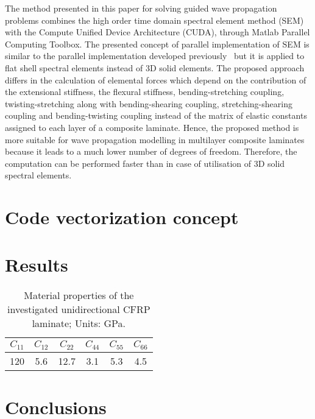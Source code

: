 \documentclass[runningheads]{llncs}
\begin{document}
The method presented in this paper for solving guided wave propagation problems combines the high order time domain spectral element method (SEM) with the Compute Unified Device Architecture (CUDA),  through Matlab Parallel Computing Toolbox. 
The presented concept of parallel implementation of SEM is similar to the parallel implementation developed previously~\cite{Kudela2016} but it is applied to flat shell spectral elements instead of 3D solid elements. 
The proposed approach differs in the calculation of elemental forces which depend on the contribution of the extensional stiffness, the flexural stiffness, bending-stretching coupling,  twisting-stretching along with bending-shearing coupling, stretching-shearing coupling and bending-twisting coupling instead of the matrix of elastic constants assigned to each layer of a composite laminate. 
Hence, the proposed method is more suitable for wave propagation modelling in multilayer composite laminates because it leads to a much lower number of degrees of freedom. 
Therefore, the computation can be performed faster than in case of utilisation of 3D solid spectral elements. 

\section{Code vectorization concept}

\section{Results}
\begin{table}
		\renewcommand{\arraystretch}{1.3}
	\caption{Material properties of the investigated unidirectional CFRP laminate; Units: GPa.}
	\begin{center}
			\begin{tabular}{cccccc} 
			\toprule
			$C_{11}$ & $C_{12}$  & $C_{22}$ & $C_{44}$ & $C_{55}$ & $C_{66}$\\
			\midrule
			120& 5.6& 12.7 & 3.1 & 5.3 & 4.5\\
			\bottomrule 
		\end{tabular} 
	\end{center}
		\label{tab:mat_prop}

\end{table}

\section{Conclusions}
\end{document}
